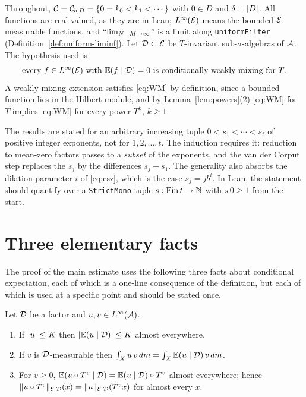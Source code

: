 \label{chap:wm}

Throughout, $\mathcal{C} = \mathcal{C}_{b,D} = \{0=k_0<k_1<\cdots\}$ with $0 \in D$ and $\delta = \lvert D \rvert$.
All functions are real-valued, as they are in Lean; $L^{\infty}(\mathcal{E})$ means the bounded
$\mathcal{E}$-measurable functions, and ``$\lim_{N-M \to \infty}$'' is a limit along \texttt{uniformFilter}
(Definition~\ref{def:uniform-liminf}).  Let $\mathcal{D} \subset \mathcal{E}$ be $T$-invariant
sub-$\sigma$-algebras of $\mathcal{A}$.  The hypothesis used is
\begin{equation}
  \label{eq:WM}
  \text{every } f \in L^{\infty}(\mathcal{E}) \text{ with } \mathbb{E}(f \mid \mathcal{D}) = 0 \text{ is conditionally weakly mixing for } T .
\end{equation}
A weakly mixing extension satisfies \eqref{eq:WM} by definition, since a bounded function lies in
the Hilbert module, and by Lemma~\ref{lem:powers}(2) \eqref{eq:WM} for $T$ implies \eqref{eq:WM}
for every power $T^k$, $k \geq 1$.

\begin{remark}
  The results are stated for an arbitrary increasing tuple $0 < s_1 < \cdots < s_t$ of positive
  integer exponents, not for $1,2,\dots,t$.  The induction requires it: reduction to mean-zero
  factors passes to a \emph{subset} of the exponents, and the van der Corput step replaces the
  $s_j$ by the differences $s_j - s_1$.  The generality also absorbs the dilation parameter $i$
  of \eqref{eq:csz}, which is the case $s_j = j b^i$.  In Lean, the statement should quantify
  over a \texttt{StrictMono} tuple $s : \mathrm{Fin}\,t \to \mathbb{N}$ with $s\,0 \geq 1$ from the start.
\end{remark}

\section{Three elementary facts}

The proof of the main estimate uses the following three facts about conditional expectation,
each of which is a one-line consequence of the definition, but each of which is used at a
specific point and should be stated once.

\begin{lemma}
  \label{lem:condexp-facts}
  \leanok
  Let $\mathcal{D}$ be a factor and $u, v \in L^{\infty}(\mathcal{A})$.
  \begin{enumerate}
    \item[(a)] If $\lvert u \rvert \leq K$ then $\lvert \mathbb{E}(u \mid \mathcal{D}) \rvert \leq K$ almost everywhere.
    \item[(b)] If $v$ is $\mathcal{D}$-measurable then $\int_X u\, v \, dm = \int_X \mathbb{E}(u\mid\mathcal{D})\, v \, dm$.
    \item[(c)] For $v \geq 0$, $\mathbb{E}(u \circ T^v \mid \mathcal{D}) = \mathbb{E}(u \mid \mathcal{D}) \circ T^v$
      almost everywhere; hence $\lVert u \circ T^v \rVert_{\mathcal{E} \mid \mathcal{D}}(x) = \lVert u \rVert_{\mathcal{E} \mid \mathcal{D}}(T^v x)$ for almost every $x$.
  \end{enumerate}
\end{lemma}

